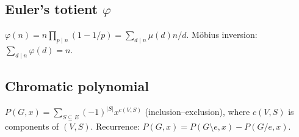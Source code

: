 \subsection{Euler's totient $\varphi$}
\label{subsec:euler-totient}

$\varphi(n)=n\prod_{p\mid n}(1-1/p)=\sum_{d\mid n}\mu(d)n/d$. M\"obius inversion: $\sum_{d\mid n}\varphi(d)=n$.

\subsection{Chromatic polynomial}
\label{subsec:chromatic}

$P(G,x)=\sum_{S\subseteq E}(-1)^{|S|}x^{c(V,S)}$ (inclusion–exclusion), where $c(V,S)$ is components of $(V,S)$. Recurrence: $P(G,x)=P(G\setminus e,x)-P(G/e,x)$.
